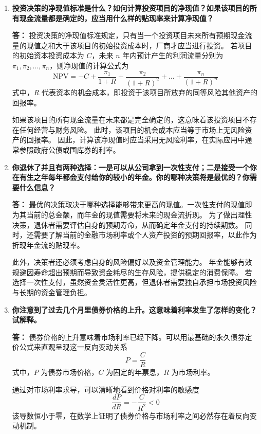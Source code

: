 \begin{enumerate}[label=\textbf{\arabic*.}, leftmargin=*]
		不同公司债券的有效收益率存在差异，其核心原因在于债券发行主体的违约风险不同。
		财务状况较弱、信用评级较低的公司，其债券发生违约的可能性更大。
		为了吸引风险厌恶型的投资者，这些公司必须提供更高的风险溢价，从而导致其债券具有较高的有效收益率。
		
		\item \textbf{投资决策的净现值标准是什么？如何计算投资项目的净现值？如果该项目的所有现金流量都是确定的，应当用什么样的贴现率来计算净现值？}
		
		\textbf{答：}
		投资决策的净现值标准规定，只有当一个投资项目未来所有预期现金流量的现值之和大于该项目的初始投资成本时，厂商才应当进行投资。
		若项目的初始资本投资成本为 $C$，未来 $n$ 年内预计产生的利润流量分别为 $\pi_1, \pi_2, \dots, \pi_n$，则净现值的计算公式为
		\[
		\text{NPV} = -C + \frac{\pi_1}{1+R} + \frac{\pi_2}{(1+R)^2} + \dots + \frac{\pi_n}{(1+R)^n}
		\]
		式中，$R$ 代表资本的机会成本，即投资于该项目所放弃的同等风险其他资产的回报率。
		
		如果该项目的所有现金流量在未来都是完全确定的，这意味着该投资项目不存在任何经营与财务风险。
		此时，该项目的机会成本应当等于市场上无风险资产的回报率。
		因此，计算该净现值时应当采用无风险利率，在实际应用中通常参照政府公债或国库券的利率。
		
		\item \textbf{你退休了并且有两种选择：一是可以从公司拿到一次性支付；二是接受一个你在有生之年每年都会支付给你的较小的年金。你的哪种决策将是最优的？你需要什么信息？}
		
		\textbf{答：}
		最优的决策取决于哪种选择能够带来更高的现值。一次性支付的现值即为其当前的总金额，而年金的现值需要将未来的现金流折现。
		为了做出理性决策，退休者需要评估自身的预期寿命，从而确定年金支付的持续期数。
		同时，还需要了解当前的金融市场利率或个人资产投资的预期回报率，以此作为折现年金流的贴现率。
		
		此外，决策者还必须考虑自身的风险偏好以及资金管理能力。
		年金能够有效规避因寿命超出预期而导致资金耗尽的生存风险，提供稳定的消费保障。
		若选择一次性支付，虽然资金灵活性更高，但退休者需要独自承担市场投资风险与长期的资金管理负担。
		
		\item \textbf{你注意到了过去几个月里债券价格的上升。这意味着利率发生了怎样的变化？试解释。}
		
		\textbf{答：}
		债券价格的上升意味着市场利率已经下降。可以用最基础的永久债券定价公式来直观呈现这一反向变动关系
		\[
		P = \frac{C}{R}
		\]
		式中，$P$ 为债券市场价格，$C$ 为固定的年票息，$R$ 为市场利率。
		
		通过对市场利率求导，可以清晰地看到价格对利率的敏感度
		\[
		\frac{dP}{dR} = -\frac{C}{R^2} < 0
		\]
		该导数恒小于零，在数学上证明了债券价格与市场利率之间必然存在着反向变动机制。
		

\end{enumerate}
